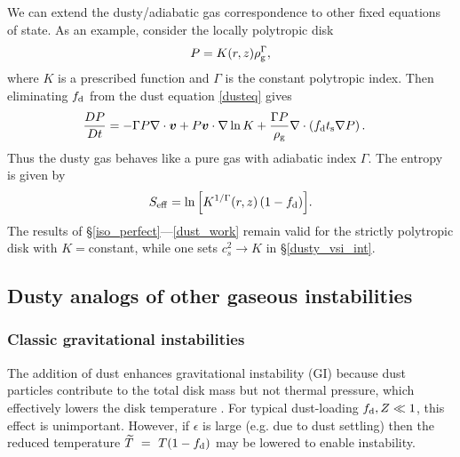 We can extend the dusty/adiabatic gas correspondence to 
other fixed equations of state. As an example, consider the locally
polytropic disk 
\begin{align}
  P = K(r,z)\rho_\mathrm{g}^{\Gamma}, 
\end{align}
where $K$ is a prescribed function and $\Gamma$ is the constant
polytropic index. Then eliminating $f_\mathrm{d}$ from the dust equation
\ref{dusteq} gives 
\begin{align}\label{poly_energy}
  \frac{D P}{D t} &= - \Gamma P\nabla\cdot\bm{v}  + P \bm{v}\cdot\nabla
  \ln{K} + \frac{\Gamma P}{\rho_\mathrm{g}}\nabla\cdot\left(f_\mathrm{d}t_\mathrm{s}\nabla
  P\right). 
\end{align}
Thus the dusty gas behaves like a pure gas with adiabatic index
$\Gamma$. The entropy is given by 
\begin{align}
  S_\mathrm{eff} = \ln{\left[K^{1/\Gamma}(r,z)\left(1 - f_\mathrm{d}\right)\right]}.  
\end{align}
The results of \S\ref{iso_perfect}---\ref{dust_work} remain valid for the strictly 
polytropic disk with $K=$constant, while one sets $c_s^2\to K$ in
\S\ref{dusty_vsi_int}. 








\subsection{Dusty analogs of other gaseous instabilities} \label{dust_analogs} 


\subsubsection{Classic gravitational instabilities} %
The addition of dust enhances gravitational
instability (GI) because dust particles contribute to the
total disk mass but not thermal pressure, which effectively lowers the
disk temperature \citep[][]{thompson88,shi13}. For typical dust-loading 
$f_\mathrm{d}, Z\ll1$, this effect is unimportant. However, if $\epsilon$ is
large (e.g. due to dust settling) then the reduced temperature
$\widetilde{T}~=~T(1 - f_\mathrm{d})$ may be lowered to enable instability.  

